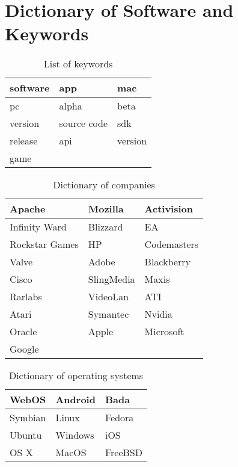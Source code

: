 \chapter{Dictionary of Software and Keywords}
\label{app:dictionary}

\begin{table}[h]
\begin{center}
\begin{tabular}{|l|l|l|}\hline
software&app&mac\\\hline
pc&alpha&beta\\\hline
version&source code&sdk\\\hline
release&api&version\\\hline
game&&\\\hline
\end{tabular}
\end{center}
\caption{List of keywords}
\end{table}

\begin{table}[h]
\begin{center}
\begin{tabular}{|l|l|l|}\hline
Apache&Mozilla&Activision\\\hline
Infinity Ward&Blizzard&EA\\\hline
Rockstar Games&HP&Codemasters\\\hline
Valve&Adobe&Blackberry\\\hline
Cisco&SlingMedia&Maxis\\\hline
Rarlabs&VideoLan&ATI\\\hline
Atari&Symantec&Nvidia\\\hline
Oracle&Apple&Microsoft\\\hline
Google&&\\\hline
\end{tabular}
\end{center}
\caption{Dictionary of companies}
\end{table}

\begin{table}[h]
\begin{center}
\begin{tabular}{|l|l|l|}\hline
WebOS&Android&Bada\\\hline
Symbian&Linux&Fedora\\\hline
Ubuntu&Windows&iOS\\\hline
OS X&MacOS&FreeBSD\\\hline
\end{tabular}
\end{center}
\caption{Dictionary of operating systems}
\end{table}


